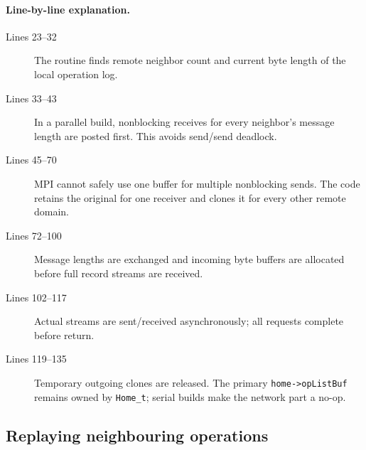 \documentclass[11pt]{article}
\newcommand{\code}[1]{\texorpdfstring{\nolinkurl{#1}}{#1}}
\begin{document}
\paragraph{Line-by-line explanation.}
\begin{description}
\item[Lines 23--32] The routine finds remote neighbor count and current byte
length of the local operation log.
\item[Lines 33--43] In a parallel build, nonblocking receives for every
neighbor's message length are posted first. This avoids send/send deadlock.
\item[Lines 45--70] MPI cannot safely use one buffer for multiple
nonblocking sends. The code retains the original for one receiver and clones
it for every other remote domain.
\item[Lines 72--100] Message lengths are exchanged and incoming byte buffers
are allocated before full record streams are received.
\item[Lines 102--117] Actual streams are sent/received asynchronously; all
requests complete before return.
\item[Lines 119--135] Temporary outgoing clones are released. The primary
\code{home->opListBuf} remains owned by \code{Home_t}; serial builds make the
network part a no-op.
\end{description}

\subsection{Replaying neighbouring operations}




\end{document}
